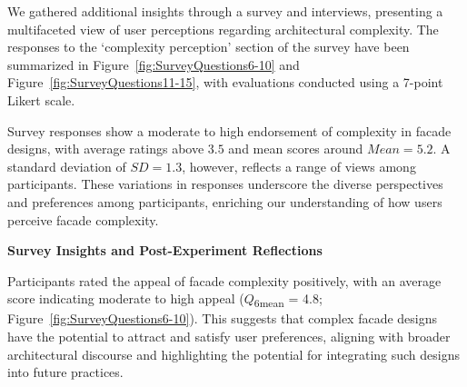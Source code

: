 %    


We gathered additional insights through a survey and interviews, presenting a multifaceted view of user perceptions regarding architectural complexity.
The responses to the `complexity perception' section of the survey have been summarized in Figure~\ref{fig:SurveyQuestions6-10} and Figure~\ref{fig:SurveyQuestions11-15}, with evaluations conducted using a 7-point Likert scale.

Survey responses show a moderate to high endorsement of complexity in facade designs, with average ratings above \(3.5\) and mean scores around \(Mean = 5.2\).
A standard deviation of \(SD = 1.3\), however, reflects a range of views among participants.
These variations in responses underscore the diverse perspectives and preferences among participants, enriching our understanding of how users perceive facade complexity.

\textbf{Survey Insights and Post-Experiment Reflections}


Participants rated the appeal of facade complexity positively, with an average score indicating moderate to high appeal (\(Q\)\textsubscript{\small{6mean}} = 4.8; Figure~\ref{fig:SurveyQuestions6-10}).
This suggests that complex facade designs have the potential to attract and satisfy user preferences, aligning with broader architectural discourse and highlighting the potential for integrating such designs into future practices.

